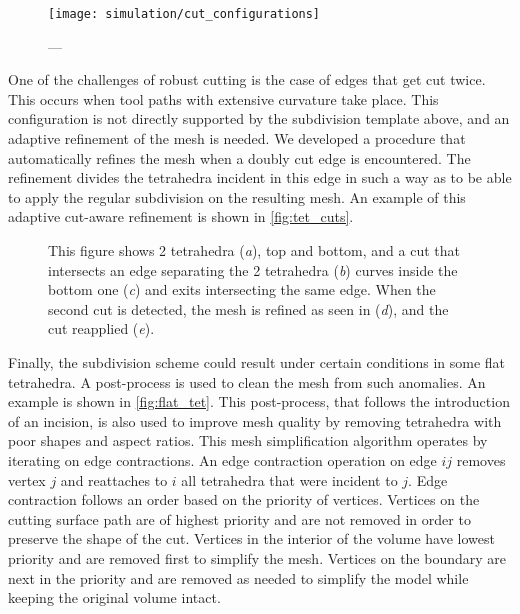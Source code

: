 \begin{figure}
  \centering%
  \texttt{[image: simulation/cut\_configurations]}
  \caption{---}\label{fig:discontinuous_tetrahedra_fem}
\end{figure}


One of the challenges of robust cutting is the case of edges that get cut twice. This occurs when tool paths with extensive curvature take place. This configuration is not directly supported by the subdivision template above, and an adaptive refinement of the mesh is needed. We developed a procedure that automatically refines the mesh when a doubly cut edge is encountered. The refinement divides the tetrahedra incident in this edge in such a way as to be able to apply the regular subdivision on the resulting mesh.  An example of this adaptive cut-aware refinement is shown in \autoref{fig:tet_cuts}.

\begin{figure}
  \centering%
  \hfill%
  \hfill%
  \hfill%
  \hfill%
  \caption{This figure shows 2 tetrahedra (\emph{a}), top and bottom, and a cut that intersects an edge separating the 2 tetrahedra (\emph{b}) curves inside the bottom one (\emph{c}) and exits intersecting the same edge. When the second cut is detected, the mesh is refined as seen in (\emph{d}), and the cut reapplied (\emph{e}).}\label{fig:tet_cuts}
\end{figure}


Finally, the subdivision scheme could result under certain conditions in some flat tetrahedra. A post-process is used to clean the mesh from such anomalies. An example is shown in \autoref{fig:flat_tet}. This post-process, that follows the introduction of an incision, is also used to improve mesh quality by removing tetrahedra with poor shapes and aspect ratios. This mesh simplification algorithm operates by iterating on edge contractions. An edge contraction operation on edge $ij$ removes vertex $j$ and reattaches to $i$ all tetrahedra that were incident to $j$. Edge contraction follows an order based on the priority of vertices. Vertices on the cutting surface path are of highest priority and are not removed in order to preserve the shape of the cut. Vertices in the interior of the volume have lowest priority and are removed first to simplify the mesh. Vertices on the boundary are next in the priority and are removed as needed to simplify the model while keeping the original volume intact.


